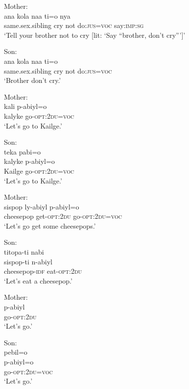 \documentclass[output=paper]{langsci/langscibook}
\begin{document}
\begin{exe}
	\ex \label{ex:rumsey:ar25}
	\begin{xlist}
	\ex Mother:\label{ex:rumsey:ar25a}\\
	\gll ana kola naa ti=o nya\\
	same.sex.sibling cry not do:\textsc{jus}=\textsc{voc} say:\textsc{imp}:\textsc{sg}\\
	\trans ‘Tell your brother not to cry [lit: ‘Say “brother, don’t cry”’]’ 	
	
	\ex Son:\label{ex:rumsey:ar25b}\\
	\gll ana kola naa ti=o\\
	same.sex.sibling cry not do:\textsc{jus}=\textsc{voc}\\
	\trans ‘Brother don’t cry.’
	
	\ex Mother:\label{ex:rumsey:ar25c}\\
	\gll kali p-abiyl=o\\
	kalyke go-\textsc{opt}:2\textsc{du}=\textsc{voc}\\
	\trans ‘Let’s go to Kailge.’
	
	\ex Son:\label{ex:rumsey:ar25d}\\
	\glll teka pabi=o\\
	kalyke p-abiyl=o\\
	Kailge go-\textsc{opt}:2\textsc{du}=\textsc{voc}\\
	\trans ‘Let’s go to Kailge.’
	
	\ex 	Mother: \label{ex:rumsey:ar25e}\\
	\gll sispop ly-abiyl p-abiyl=o\\
	cheesepop get-\textsc{opt}:2\textsc{du} go-\textsc{opt}:2\textsc{du}=\textsc{voc}\\
	\trans ‘Let’s go get some cheesepops.’
	
	\ex Son:	\label{ex:rumsey:ar25f}\\
	\glll titopa-ti nabi\\ 
	sispop-ti n-abiyl\\
	cheesepop-\textsc{idf} eat-\textsc{opt}:2\textsc{du}\\
	\trans ‘Let’s eat a cheesepop.’
	
	\ex Mother:\label{ex:rumsey:ar25g}\\
	\gll p-abiyl\\
	go-\textsc{opt}:2\textsc{du}\\
	\trans ‘Let’s go.’
	
	\ex Son:\label{ex:rumsey:ar25h}\\ 
	\glll pebil=o\\
	p-abiyl=o\\
	go-\textsc{opt}:2\textsc{du}=\textsc{voc}\\
	\trans ‘Let’s go.’
	

\end{xlist}
\end{exe}
\end{document}
